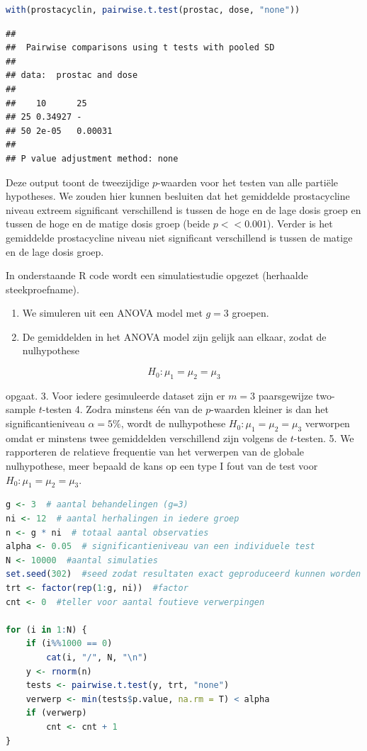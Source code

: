 \documentclass[
  12pt,dutch,coursenotes]{book}
\providecommand{\tightlist}{%
  \setlength{\itemsep}{0pt}\setlength{\parskip}{0pt}}
\theoremstyle{definition}
\theoremstyle{definition}
\theoremstyle{definition}
\theoremstyle{definition}
\theoremstyle{remark}
\begin{document}
\begin{lstlisting}[language=R]
with(prostacyclin, pairwise.t.test(prostac, dose, "none"))
\end{lstlisting}

\begin{lstlisting}
## 
##  Pairwise comparisons using t tests with pooled SD 
## 
## data:  prostac and dose 
## 
##    10      25     
## 25 0.34927 -      
## 50 2e-05   0.00031
## 
## P value adjustment method: none
\end{lstlisting}

Deze output toont de tweezijdige \(p\)-waarden voor het testen van alle partiële hypotheses.
We zouden hier kunnen besluiten dat het gemiddelde prostacycline niveau extreem significant verschillend is tussen de hoge en de lage dosis groep en tussen de hoge en de matige dosis groep (beide \(p<<0.001\)).
Verder is het gemiddelde prostacycline niveau niet significant verschillend is tussen de matige en de lage dosis groep.

In onderstaande R code wordt een simulatiestudie opgezet (herhaalde steekproefname).

\begin{enumerate}
\def\labelenumi{\arabic{enumi}.}
\tightlist
\item
  We simuleren uit een ANOVA model met \(g=3\) groepen.
\item
  De gemiddelden in het ANOVA model zijn gelijk aan elkaar, zodat de nulhypothese
\end{enumerate}

\[H_0: \mu_1=\mu_2=\mu_3\]

opgaat.
3. Voor iedere gesimuleerde dataset zijn er \(m=3\) paarsgewijze two-sample \(t\)-testen
4. Zodra minstens één van de \(p\)-waarden kleiner is dan het significantieniveau \(\alpha=5\%\), wordt de nulhypothese \(H_0: \mu_1=\mu_2=\mu_3\) verworpen omdat er minstens twee gemiddelden verschillend zijn volgens de \(t\)-testen.
5. We rapporteren de relatieve frequentie van het verwerpen van de globale nulhypothese, meer bepaald de kans op een type I fout van de test voor \(H_0: \mu_1=\mu_2=\mu_3\).

\begin{lstlisting}[language=R]
g <- 3  # aantal behandelingen (g=3)
ni <- 12  # aantal herhalingen in iedere groep
n <- g * ni  # totaal aantal observaties
alpha <- 0.05  # significantieniveau van een individuele test
N <- 10000  #aantal simulaties
set.seed(302)  #seed zodat resultaten exact geproduceerd kunnen worden
trt <- factor(rep(1:g, ni))  #factor
cnt <- 0  #teller voor aantal foutieve verwerpingen

for (i in 1:N) {
    if (i%%1000 == 0)
        cat(i, "/", N, "\n")
    y <- rnorm(n)
    tests <- pairwise.t.test(y, trt, "none")
    verwerp <- min(tests$p.value, na.rm = T) < alpha
    if (verwerp)
        cnt <- cnt + 1
}
\end{lstlisting}
\end{document}
